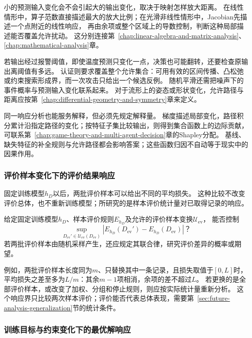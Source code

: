小的预测输入变化会不会引起大的输出变化，取决于映射怎样放大距离。
在线性情形中，算子范数直接描述最大的放大比例；在光滑非线性情形中，Jacobian先描述一个点附近的线性响应，
再由余项或整个区域上的导数控制，判断这种局部描述能否覆盖允许扰动。
这分别连接第~\ref{chap:linear-algebra-and-matrix-analysis}、\ref{chap:mathematical-analysis}章。

若输出经过报警阈值，即使温度预测只变化一点，决策也可能翻转，还要检查原输出离阈值有多远。
认证则要求覆盖整个允许集合：可用有效的区间传播、凸松弛或约束搜索形成界，而一次攻击只给出一个候选反例。
随机平滑还需把噪声下的事件概率与预测输入变化联系起来。
对于流形上的姿态或形状变化，允许路径与距离应按第~\ref{chap:differential-geometry-and-symmetry}章来定义。

同一响应分析也能服务解释，但必须先规定解释量。
梯度描述局部变化，路径积分累计沿指定路径的变化；按特征子集比较输出，则得到集合函数上的边际贡献，
可联系第~\ref{chap:game-theory-and-multi-agent-decision}章的Shapley分配。
基线、缺失特征的补全规则与允许路径都会影响答案；这些函数归因不自动等于现实中的因果作用。

\subsubsection{评价样本变化下的评价结果响应}
\label{sec:future-analysis-evaluation-sample-response}

固定训练模型$h_D$以后，两批评价样本可以给出不同的平均损失。
这种比较不改变评价总体，也不重新训练模型；所研究的是样本评价统计量对已取得记录的响应。

\begin{mathproblem}[评价样本变换造成的评价差异]
  \label{question:future-evaluation-sample-response}
  给定固定训练模型$h_D$、样本评价规则$E_{h_D}$及允许的评价样本变换$\mathcal U_{\mathrm{ev}}$，
  能否控制
  \[
    \sup_{D_{\mathrm{ev}}'\in\mathcal U_{\mathrm{ev}}(D_{\mathrm{ev}})}
      |E_{h_D}(D_{\mathrm{ev}}')-E_{h_D}(D_{\mathrm{ev}})|\text{？}
  \]
  若两批评价样本由随机采样产生，还应规定其联合律，研究评价差异的概率或期望。
\end{mathproblem}

例如，两批评价样本长度同为$m$、只替换其中一条记录，且损失取值于$[0,L]$时，
平均损失之差至多为$L/m$：其余$m-1$项相消，余项的差不超过$L$。
若更换的是全部评价样本，或改变了加权、分组和停止规则，则应按实际统计量重新分析。
这个响应界只比较两次样本评价；评价能否代表总体表现，需要第~\ref{sec:future-analysis-generalization}节的统计条件。

\subsubsection{训练目标与约束变化下的最优解响应}
\label{sec:future-analysis-solution-sensitivity}

